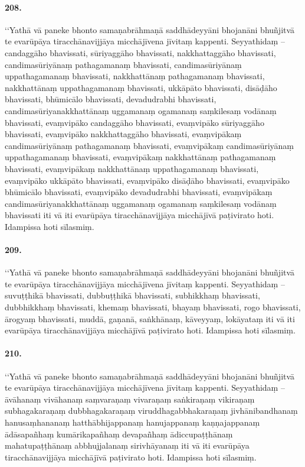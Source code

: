 \paragraph{208.} ‘‘Yathā vā paneke bhonto samaṇabrāhmaṇā saddhādeyyāni bhojanāni bhuñjitvā te evarūpāya tiracchānavijjāya micchājīvena jīvitaṃ kappenti. Seyyathidaṃ – candaggāho bhavissati, sūriyaggāho bhavissati, nakkhattaggāho bhavissati, candimasūriyānaṃ pathagamanaṃ bhavissati, candimasūriyānaṃ uppathagamanaṃ bhavissati, nakkhattānaṃ pathagamanaṃ bhavissati, nakkhattānaṃ uppathagamanaṃ bhavissati, ukkāpāto bhavissati, disāḍāho bhavissati, bhūmicālo bhavissati, devadudrabhi bhavissati, candimasūriyanakkhattānaṃ uggamanaṃ ogamanaṃ saṃkilesaṃ vodānaṃ bhavissati, evaṃvipāko candaggāho bhavissati, evaṃvipāko sūriyaggāho bhavissati, evaṃvipāko nakkhattaggāho bhavissati, evaṃvipākaṃ candimasūriyānaṃ pathagamanaṃ bhavissati, evaṃvipākaṃ candimasūriyānaṃ uppathagamanaṃ bhavissati, evaṃvipākaṃ nakkhattānaṃ pathagamanaṃ bhavissati, evaṃvipākaṃ nakkhattānaṃ uppathagamanaṃ bhavissati, evaṃvipāko ukkāpāto bhavissati, evaṃvipāko disāḍāho bhavissati, evaṃvipāko bhūmicālo bhavissati, evaṃvipāko devadudrabhi bhavissati, evaṃvipākaṃ candimasūriyanakkhattānaṃ uggamanaṃ ogamanaṃ saṃkilesaṃ vodānaṃ bhavissati iti vā iti evarūpāya tiracchānavijjāya micchājīvā paṭivirato hoti. Idampissa hoti sīlasmiṃ.

\paragraph{209.} ‘‘Yathā vā paneke bhonto samaṇabrāhmaṇā saddhādeyyāni bhojanāni bhuñjitvā te evarūpāya tiracchānavijjāya micchājīvena jīvitaṃ kappenti. Seyyathidaṃ – suvuṭṭhikā bhavissati, dubbuṭṭhikā bhavissati, subhikkhaṃ bhavissati, dubbhikkhaṃ bhavissati, khemaṃ bhavissati, bhayaṃ bhavissati, rogo bhavissati, ārogyaṃ bhavissati, muddā, gaṇanā, saṅkhānaṃ, kāveyyaṃ, lokāyataṃ iti vā iti evarūpāya tiracchānavijjāya micchājīvā paṭivirato hoti. Idampissa hoti sīlasmiṃ.

\paragraph{210.} ‘‘Yathā vā paneke bhonto samaṇabrāhmaṇā saddhādeyyāni bhojanāni bhuñjitvā te evarūpāya tiracchānavijjāya micchājīvena jīvitaṃ kappenti. Seyyathidaṃ – āvāhanaṃ vivāhanaṃ saṃvaraṇaṃ vivaraṇaṃ saṅkiraṇaṃ vikiraṇaṃ subhagakaraṇaṃ dubbhagakaraṇaṃ viruddhagabbhakaraṇaṃ jivhānibandhanaṃ hanusaṃhananaṃ hatthābhijappanaṃ hanujappanaṃ kaṇṇajappanaṃ ādāsapañhaṃ kumārikapañhaṃ devapañhaṃ ādiccupaṭṭhānaṃ mahatupaṭṭhānaṃ abbhujjalanaṃ sirivhāyanaṃ iti vā iti evarūpāya tiracchānavijjāya micchājīvā paṭivirato hoti. Idampissa hoti sīlasmiṃ.

